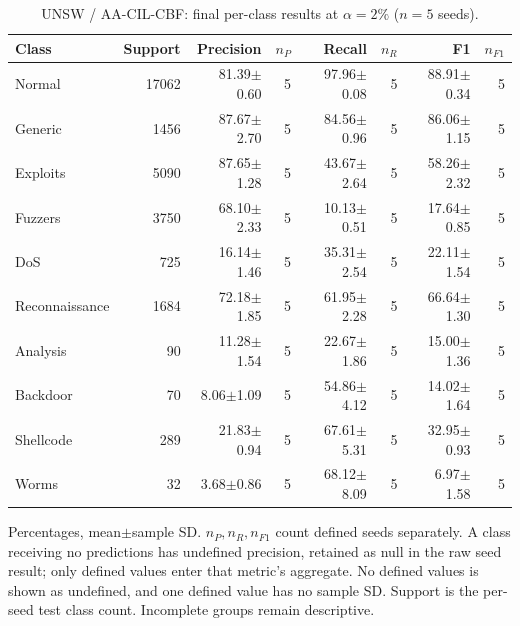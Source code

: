\begin{table}[t]
\centering\scriptsize
\setlength{\tabcolsep}{3.3pt}
\caption{UNSW / AA-CIL-CBF: final per-class results at $\alpha=2\%$ ($n=5$ seeds).}\label{tab:forgetting-class-unsw_nb15-aacil-cbf}
\begin{tabular}{lrrrrrrr}
\toprule
Class & Support & Precision & $n_P$ & Recall & $n_R$ & F1 & $n_{F1}$ \\
\midrule
Normal & 17062 & 81.39$\pm$0.60 & 5 & 97.96$\pm$0.08 & 5 & 88.91$\pm$0.34 & 5 \\
Generic & 1456 & 87.67$\pm$2.70 & 5 & 84.56$\pm$0.96 & 5 & 86.06$\pm$1.15 & 5 \\
Exploits & 5090 & 87.65$\pm$1.28 & 5 & 43.67$\pm$2.64 & 5 & 58.26$\pm$2.32 & 5 \\
Fuzzers & 3750 & 68.10$\pm$2.33 & 5 & 10.13$\pm$0.51 & 5 & 17.64$\pm$0.85 & 5 \\
DoS & 725 & 16.14$\pm$1.46 & 5 & 35.31$\pm$2.54 & 5 & 22.11$\pm$1.54 & 5 \\
Reconnaissance & 1684 & 72.18$\pm$1.85 & 5 & 61.95$\pm$2.28 & 5 & 66.64$\pm$1.30 & 5 \\
Analysis & 90 & 11.28$\pm$1.54 & 5 & 22.67$\pm$1.86 & 5 & 15.00$\pm$1.36 & 5 \\
Backdoor & 70 & 8.06$\pm$1.09 & 5 & 54.86$\pm$4.12 & 5 & 14.02$\pm$1.64 & 5 \\
Shellcode & 289 & 21.83$\pm$0.94 & 5 & 67.61$\pm$5.31 & 5 & 32.95$\pm$0.93 & 5 \\
Worms & 32 & 3.68$\pm$0.86 & 5 & 68.12$\pm$8.09 & 5 & 6.97$\pm$1.58 & 5 \\
\bottomrule
\end{tabular}
\par\smallskip\begin{minipage}{0.98\textwidth}\scriptsize Percentages, mean$\pm$sample SD. $n_P,n_R,n_{F1}$ count defined seeds separately. A class receiving no predictions has undefined precision, retained as null in the raw seed result; only defined values enter that metric's aggregate. No defined values is shown as undefined, and one defined value has no sample SD. Support is the per-seed test class count. Incomplete groups remain descriptive.\end{minipage}
\end{table}

